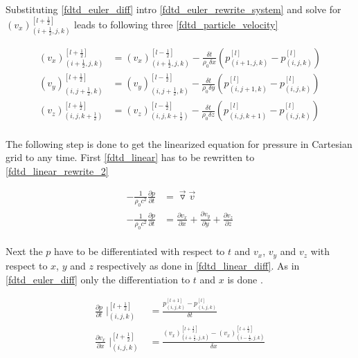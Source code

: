 Substituting \autoref{fdtd_euler_diff} intro \autoref{fdtd_euler_rewrite_system} and solve for $(v_x)_{(i+\frac{1}{2},j,k)}^{[l+\frac{1}{2}]}$ leads to following three \autoref{fdtd_particle_velocity}


\begin{subequations}\label{fdtd_particle_velocity}
\begin{alignat}{2}
(v_x)_{(i+\frac{1}{2},j,k)}^{[l+\frac{1}{2}]}&= (v_x)_{(i+\frac{1}{2},j,k)}^{[l-\frac{1}{2}]}-\frac{\delta t}{\rho_0 \delta x} \left( p_{(i+1,j,k)}^{[l]} -p_{(i,j,k)}^{[l]}  \right)\\
(v_y)_{(i,j+\frac{1}{2},k)}^{[l+\frac{1}{2}]}&= (v_y)_{(i,j+\frac{1}{2},k)}^{[l-\frac{1}{2}]}-\frac{\delta t}{\rho_0 \delta y} \left( p_{(i,j+1,k)}^{[l]} -p_{(i,j,k)}^{[l]}  \right)\\
(v_z)_{(i,j,k+\frac{1}{2})}^{[l+\frac{1}{2}]}&= (v_z)_{(i,j,k+\frac{1}{2})}^{[l-\frac{1}{2}]}-\frac{\delta t}{\rho_0 \delta z} \left( p_{(i,j,k+1)}^{[l]} -p_{(i,j,k)}^{[l]}  \right)
\end{alignat}
\end{subequations}
\\

The following step is done to get the linearized equation for pressure in Cartesian grid to any time. First \autoref{fdtd_linear} has to be rewritten to \autoref{fdtd_linear_rewrite_2}

\begin{subequations}\label{fdtd_linear_rewrite}
\begin{alignat}{2}
- \frac{1}{\rho_0c^2} \frac{\partial p}{\partial t} &=\vec{\triangledown }\vec{v} \label{fdtd_linear_rewrite_1}\\
- \frac{1}{\rho_0c^2} \frac{\partial p}{\partial t} &=\frac{\partial v_x}{\partial x}+\frac{\partial v_y}{\partial y}+\frac{\partial v_z}{\partial z}\label{fdtd_linear_rewrite_2}
\end{alignat}
\end{subequations}
\\


Next the $p$ have to be differentiated with respect to $t$ and $v_x$, $v_y$ and $v_z$ with respect to $x$, $y$ and $z$ respectively as done in \autoref{fdtd_linear_diff}. As in \autoref{fdtd_euler_diff} only the differentiation to $t$ and $x$ is done \citep{Sakuma2014}.



\begin{subequations}\label{fdtd_linear_diff}
\begin{alignat}{2}
\frac{\partial p}{\partial t}\mid _{(i,j,k)}^{[l+\frac{1}{2}]} &= \frac{p_{(i,j,k)}^{[l+1]} -p_{(i,j,k)}^{[l]}}{\delta t} \label{fdtd_linear_diff_1}\\
\frac{\partial v_x}{\partial x}\mid _{(i,j,k)}^{[l+\frac{1}{2}]} &= \frac{(v_x)_{(i+\frac{1}{2},j,k)}^{[l+\frac{1}{2}]} -(v_x)_{(i-\frac{1}{2},j,k)}^{[l+\frac{1}{2}]}}{\delta x} \label{fdtd_euler_diff_2}
\end{alignat}
\end{subequations}


